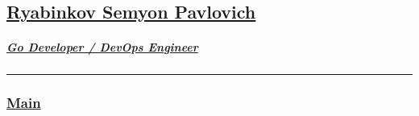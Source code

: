 \subsection{\texorpdfstring{\hyperref[Ryabinkovux5cux2520Semyonux5cux2520Pavlovich]{Ryabinkov
Semyon
Pavlovich}}{Ryabinkov Semyon Pavlovich}}\label{Ryabinkovux20Semyonux20Pavlovich}

\label{Ryabinkovux20Semyonux20Pavlovich-Goux20Developerux20ux2fux20DevOpsux20Engineer}
\subparagraph{\texorpdfstring{\hyperref[Ryabinkovux5cux2520Semyonux5cux2520Pavlovich-Goux5cux2520Developerux5cux2520ux2fux5cux2520DevOpsux5cux2520Engineer]{Go
Developer / DevOps
Engineer}}{Go Developer / DevOps Engineer}}\label{Goux20Developerux20ux2fux20DevOpsux20Engineer}

\begin{center}\rule{0.5\linewidth}{0.5pt}\end{center}

\label{Ryabinkovux20Semyonux20Pavlovich-Main}
\subsubsection{\texorpdfstring{\hyperref[Ryabinkovux5cux2520Semyonux5cux2520Pavlovich-Main]{Main}}{Main}}\label{Main}

